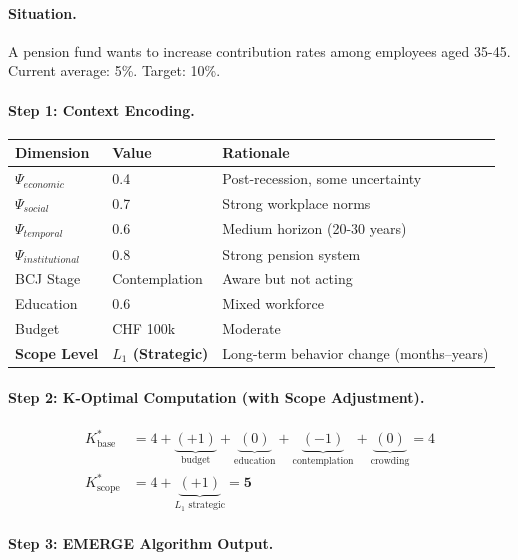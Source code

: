 \paragraph{Situation.} A pension fund wants to increase contribution rates among employees aged 35-45. Current average: 5\%. Target: 10\%.

\paragraph{Step 1: Context Encoding.}

\begin{center}
\begin{tabular}{@{}lll@{}}
\toprule
\textbf{Dimension} & \textbf{Value} & \textbf{Rationale} \\
\midrule
$\Psi_{economic}$ & 0.4 & Post-recession, some uncertainty \\
$\Psi_{social}$ & 0.7 & Strong workplace norms \\
$\Psi_{temporal}$ & 0.6 & Medium horizon (20-30 years) \\
$\Psi_{institutional}$ & 0.8 & Strong pension system \\
BCJ Stage & Contemplation & Aware but not acting \\
Education & 0.6 & Mixed workforce \\
Budget & CHF 100k & Moderate \\
\textbf{Scope Level} & \textbf{$L_1$ (Strategic)} & Long-term behavior change (months--years) \\
\bottomrule
\end{tabular}
\end{center}

\paragraph{Step 2: K-Optimal Computation (with Scope Adjustment).}

\begin{align}
K^*_{\text{base}} &= 4 + \underbrace{(+1)}_{\text{budget}} + \underbrace{(0)}_{\text{education}} + \underbrace{(-1)}_{\text{contemplation}} + \underbrace{(0)}_{\text{crowding}} = 4 \\
K^*_{\text{scope}} &= 4 + \underbrace{(+1)}_{L_1 \text{ strategic}} = \mathbf{5}
\end{align}

\paragraph{Step 3: EMERGE Algorithm Output.}

